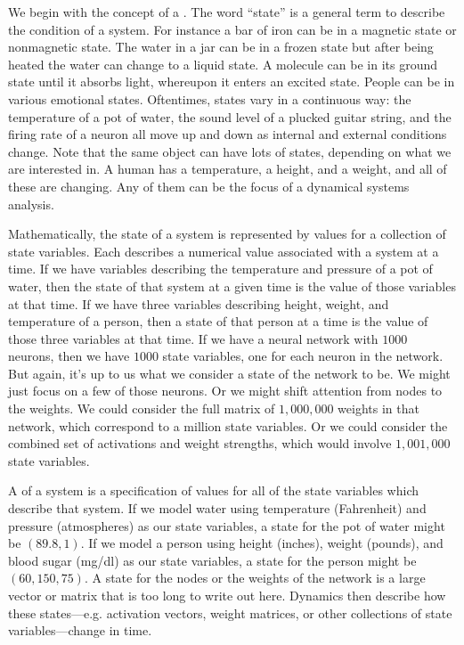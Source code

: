 We begin with the concept of a . The word ``state'' is a general term to describe the condition of a system. For instance a bar of iron can be in a magnetic state or nonmagnetic
state. The water in a jar can be in a frozen state but after being heated the
water can change to a liquid state. A molecule can be in its ground state
until it absorbs light, whereupon it enters an excited state. People can be in
various emotional states. Oftentimes, states vary in a continuous way: the temperature
of a pot of water, the sound level of a plucked guitar string, and the firing rate of a neuron all move up and down as internal and external conditions change. Note that the same object can have lots of states, depending on what we are interested in. A human has a temperature, a height, and a weight, and all of these are changing. Any of them can be the focus of a dynamical systems analysis.

Mathematically, the state of a system is represented by values for a collection of  state variables. Each  describes a numerical value associated with a system at a time. If we have variables describing the temperature and pressure of a pot of water, then the state of that system at a given time is the value of those variables at that time. If we have three variables describing height, weight, and temperature of a person, then a state of that person at a time is the value of those three variables at that time. If we have a neural network with $1000$ neurons, then we have $1000$ state variables, one for each neuron in the network. But again, it's up to us what we consider a state of the network to be. We might just focus on a few of those neurons. Or we might shift attention from nodes to the weights. We could consider the full matrix of $1,000,000$ weights in that network, which correspond to a million state variables. Or we could consider the combined set of activations and weight strengths, which would involve $1,001,000$ state variables.

A  of a system is a specification of values for all of the state variables which describe that system. If we model water using temperature (Fahrenheit) and pressure (atmospheres) as our state variables, a state for the pot of water might be $(89.8, 1)$. If we model a person using height (inches), weight (pounds), and blood sugar (mg/dl) as our state variables, a  state for the person might be $(60,150,75)$. A state for the nodes or the weights of the network is a large vector or matrix that is too long to write out here. Dynamics then describe how these states---e.g. activation vectors, weight matrices, or other collections of state variables---change in time.

